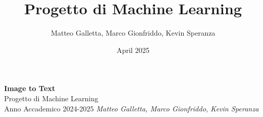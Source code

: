 \documentclass[12pt,a4paper,openany,oneside]{book}
\title{Progetto di Machine Learning}
\author{Matteo Galletta, Marco Gionfriddo, Kevin Speranza}
\date{April 2025}
\begin{document}
\begin{titlepage}
    \centering
    \vspace*{3cm}
    {\Huge \textbf{Image to Text}}\\[2cm]
    {\Large Progetto di Machine Learning}\\[1cm]
    {\Large Anno Accademico 2024-2025}
    \vfill
    \normalsize{\textit{Matteo Galletta, Marco Gionfriddo, Kevin Speranza}}
\end{titlepage}
\tableofcontents
\newpage
{}









\end{document}
